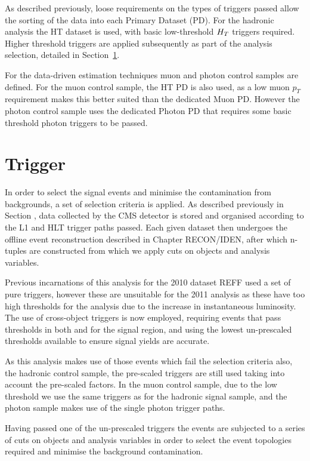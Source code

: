 As described previously, loose requirements on the types of triggers passed allow the sorting of the data into each Primary Dataset (PD). For the hadronic analysis the HT dataset is used, with basic low-threshold $H_{T} $ triggers required. Higher threshold triggers are applied subsequently as part of the analysis selection, detailed in Section~\ref{sec:trig}. 

For the data-driven estimation techniques muon and photon control samples are defined. For the muon control sample, the HT PD is also used, as a low muon $p_{T}$ requirement makes this better suited than the dedicated Muon PD. However the photon control sample uses the dedicated Photon PD that requires some basic threshold photon triggers to be passed. 



\section{Trigger}
\label{sec:trig}
In order to select the signal events and minimise the contamination from backgrounds, a set of selection criteria is applied. As described previously in Section , data collected by the CMS detector is stored and organised according to the L1 and HLT trigger paths passed. Each given dataset then undergoes the offline event reconstruction described in Chapter RECON/IDEN, after which n-tuples are constructed from which we apply cuts on objects and analysis variables. 

Previous incarnations of this analysis for the 2010 dataset REFF used a set of pure \HT triggers, however these are unsuitable for the 2011 analysis as these have too high thresholds for the analysis due to the increase in instantaneous luminosity. The use of cross-object triggers is now  employed, requiring events that pass thresholds in both \HT and \mht for the signal region, and using the lowest un-prescaled thresholds available to ensure signal yields are accurate. 

As this analysis makes use of those events which fail the selection criteria also, the hadronic control sample, the pre-scaled \HT triggers are still used taking into account the pre-scaled factors. In the muon control sample, due to the low \Pt threshold we use the same triggers as for the hadronic signal sample, and the photon sample makes use of the single photon trigger paths. 




Having passed one of the un-prescaled triggers the events are subjected to a series of cuts on objects and analysis variables in order to select the event topologies required and minimise the background contamination. 
